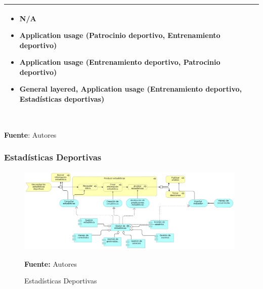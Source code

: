\begin{table}[!htb]
\begin{center}
{\begin{tabular}{|p{7cm}|p{4cm}|}
\begin{itemize}
				\item N/A
				\item Application usage (Patrocinio deportivo, Entrenamiento deportivo)
				\item Application usage (Entrenamiento deportivo, Patrocinio deportivo)
				\item General layered, Application usage (Entrenamiento deportivo, Estadísticas deportivas)
			\end{itemize}
			\\
			\hline
		\end{tabular}
		} \\
		\textbf{Fuente}: Autores
	\end{center}
\end{table}

\subsubsection{Estadísticas Deportivas}

\begin{figure}[!htb]
  \begin{center}
    \includegraphics[width=11cm]{./imagenes/application_usage/estadisticasdeportivas.png}
    \caption{Estadísticas Deportivas}
    \label{fig:au_estadisticas_deportivas}
    \textbf{Fuente:}  Autores
  \end{center}
\end{figure}

